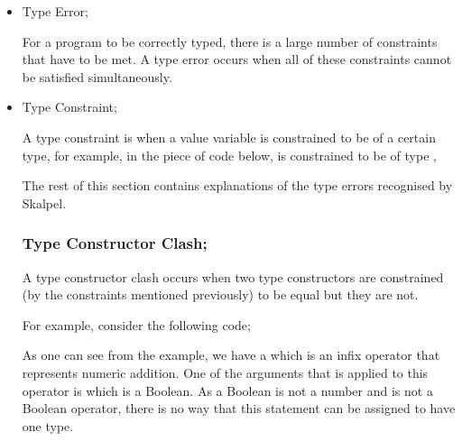 \documentclass{article}
\begin{document}
\begin{itemize}

\item Type Error;

  \subitem For a program to be correctly typed, there is a large
  number of constraints that have to be met. A type error occurs when
  all of these constraints cannot be satisfied simultaneously.



\item Type Constraint;

  \subitem A type constraint is when a value variable is constrained
  to be of a certain type, for example, in the piece of code below, 
  is constrained to be of type ,


\newpage


{\large The rest of this section contains explanations of the type errors
recognised by Skalpel.}
\vspace{0.1in}
\subsubsection{Type Constructor Clash;}

  \subitem A type constructor clash occurs when two type constructors
  are constrained (by the constraints mentioned previously) to be equal but
  they are not.

  For example, consider the following code;


As one can see from the example, we have a \incodebody{+} which is
an infix operator that represents numeric addition. One of the
arguments that is applied to this operator is 
which is a Boolean. As a Boolean is not a number and \incodebody{+}
is not a Boolean operator, there is no way that this statement can be
assigned to have one type.

 


\end{itemize}
\end{document}
